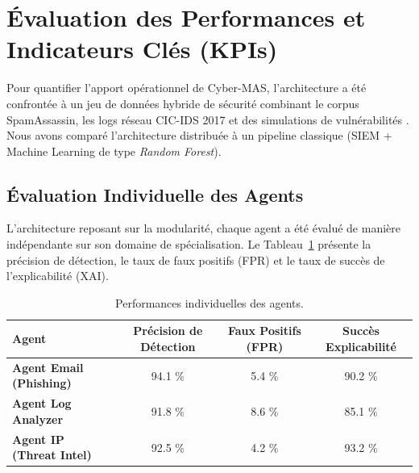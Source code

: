 \documentclass[a4paper, 12pt]{report}
\begin{document}
\section{Évaluation des Performances et Indicateurs Clés (KPIs)}
\label{sec:evaluation_performances}

Pour quantifier l'apport opérationnel de Cyber-MAS, l'architecture a été confrontée à un jeu de données hybride de sécurité combinant le corpus SpamAssassin, les logs réseau CIC-IDS 2017 et des simulations de vulnérabilités \cite{sans_soc_kpi}. Nous avons comparé l'architecture distribuée à un pipeline classique (SIEM + Machine Learning de type \textit{Random Forest}).

\subsection{Évaluation Individuelle des Agents}
L'architecture reposant sur la modularité, chaque agent a été évalué de manière indépendante sur son domaine de spécialisation. Le Tableau~\ref{tab:agent_performance} présente la précision de détection, le taux de faux positifs (FPR) et le taux de succès de l'explicabilité (XAI).

\begin{table}[htbp]
\centering
\caption[Performances individuelles des agents]{Performances individuelles des agents.}
\label{tab:agent_performance}
\vspace{0.2cm}
\begin{tabular}{|l|c|c|c|}
\hline
\textbf{Agent} & \textbf{Précision de Détection} & \textbf{Faux Positifs (FPR)} & \textbf{Succès Explicabilité} \\ \hline
\textbf{Agent Email (Phishing)} & 94.1 \% & 5.4 \% & 90.2 \% \\ \hline
\textbf{Agent Log Analyzer} & 91.8 \% & 8.6 \% & 85.1 \% \\ \hline
\textbf{Agent IP (Threat Intel)} & 92.5 \% & 4.2 \% & 93.2 \% \\ \hline
\end{tabular}
\end{table}
\end{document}
